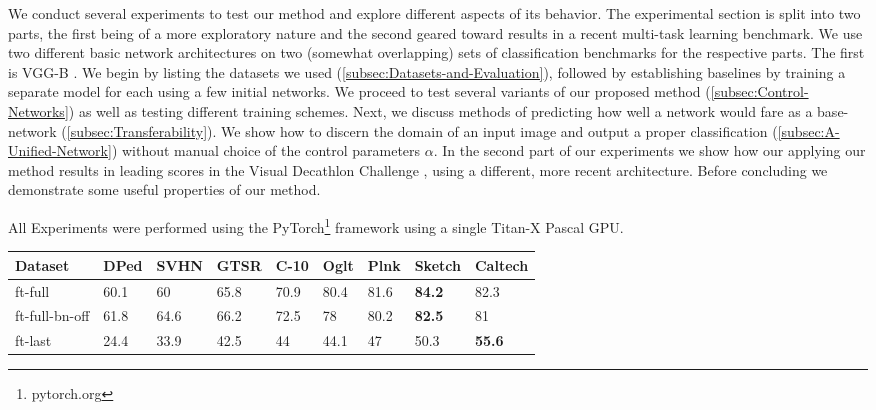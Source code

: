\documentclass[10pt,journal,compsoc]{IEEEtran}
\begin{document}
We conduct several experiments to test our method and explore different
aspects of its behavior. The experimental section is split into two
parts, the first being of a more exploratory nature and the second
geared toward results in a recent multi-task learning benchmark. We
use two different basic network architectures on two (somewhat overlapping)
sets of classification benchmarks for the respective parts. The first
is VGG-B \cite{simonyan2014very} . We begin by listing the datasets
we used (\ref{subsec:Datasets-and-Evaluation}), followed by establishing
baselines by training a separate model for each using a few initial
networks. We proceed to test several variants of our proposed method
(\ref{subsec:Control-Networks}) as well as testing different training
schemes. Next, we discuss methods of predicting how well a network
would fare as a base-network (\ref{subsec:Transferability}). We show
how to discern the domain of an input image and output a proper classification
(\ref{subsec:A-Unified-Network}) without manual choice of the control
parameters $\alpha$. In the second part of our experiments we show
how our applying our method results in leading scores in the Visual
Decathlon Challenge \cite{rebuffi2017learning}, using a different,
more recent architecture. Before concluding we demonstrate some useful
properties of our method. 

All Experiments were performed using the PyTorch\footnote{pytorch.org}
framework using a single Titan-X Pascal GPU. 
\begin{center}
\begin{table*}
\begin{centering}{\small{}}%
\begin{tabular}[t]{llllllll>{\raggedright}p{0.05\paperwidth}}{\small{}Dataset } & {\small{}DPed } & {\small{}SVHN } & {\small{}GTSR } & {\small{}C-10 } & {\small{}Oglt } & {\small{}Plnk} & {\small{}Sketch } & {\small{}Caltech }\tabularnewline
\midrule{\small{}ft-full } & {\small{}60.1 } & {\small{}60 } & {\small{}65.8 } & {\small{}70.9 } & {\small{}80.4 } & {\small{}81.6 } & \textbf{\small{}84.2 } & {\small{}82.3 }\tabularnewline
\midrule{\small{}ft-full-bn-off } & {\small{}61.8 } & {\small{}64.6 } & {\small{}66.2 } & {\small{}72.5 } & {\small{}78 } & {\small{}80.2 } & \textbf{\small{}82.5 } & {\small{}81 }\tabularnewline
\midrule{\small{}ft-last } & {\small{}24.4 } & {\small{}33.9 } & {\small{}42.5 } & {\small{}44 } & {\small{}44.1 } & {\small{}47 } & {\small{}50.3 } & \textbf{\small{}55.6 }\tabularnewline
\bottomrule
\end{tabular}
\par\end{centering}{\small \par}
\centering{}\caption{\label{tab:(a)-Mean-transfer}Mean transfer learning performance.
We show the mean top-1 accuracy (\%) attained by fine-tuning a network
from each domain to all domains. Out of the datasets above, starting
with Caltech-256 proves most generic as a feature extractor (\emph{ft-last}).
However, fine tuning is best when initially training on the Sketch
dataset (\emph{ft-full).}}
\end{table*}
\par\end{center}
\end{document}
